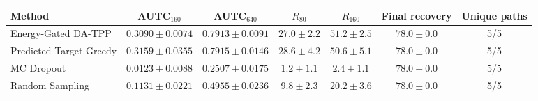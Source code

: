 \begin{tabular}{lcccccc}
\toprule
Method & AUTC$_{160}$ & AUTC$_{640}$ & $R_{80}$ & $R_{160}$ & Final recovery & Unique paths \\
\midrule
Energy-Gated DA-TPP & $0.3090 \pm 0.0074$ & $0.7913 \pm 0.0091$ & $27.0 \pm 2.2$ & $51.2 \pm 2.5$ & $78.0 \pm 0.0$ & 5/5 \\
Predicted-Target Greedy & $0.3159 \pm 0.0355$ & $0.7915 \pm 0.0146$ & $28.6 \pm 4.2$ & $50.6 \pm 5.1$ & $78.0 \pm 0.0$ & 5/5 \\
MC Dropout & $0.0123 \pm 0.0088$ & $0.2507 \pm 0.0175$ & $1.2 \pm 1.1$ & $2.4 \pm 1.1$ & $78.0 \pm 0.0$ & 5/5 \\
Random Sampling & $0.1131 \pm 0.0221$ & $0.4955 \pm 0.0236$ & $9.8 \pm 2.3$ & $20.2 \pm 3.6$ & $78.0 \pm 0.0$ & 5/5 \\
\bottomrule
\end{tabular}
